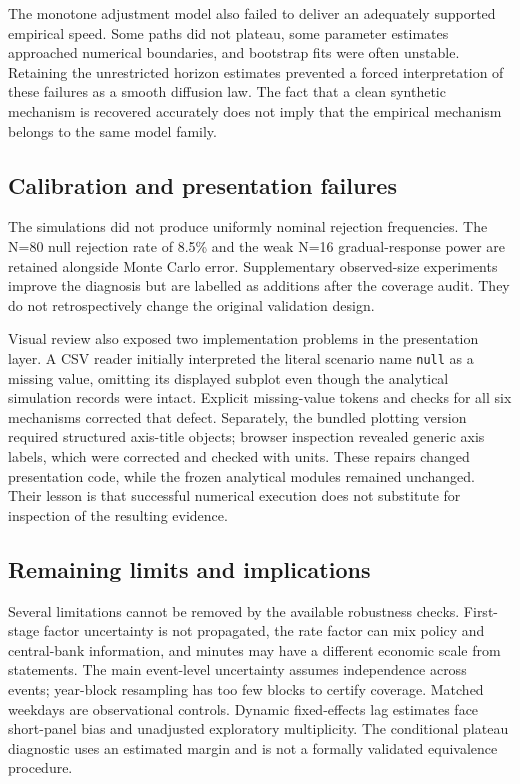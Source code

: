 The monotone adjustment model also failed to deliver an adequately supported empirical speed. Some paths did not plateau, some parameter estimates approached numerical boundaries, and bootstrap fits were often unstable. Retaining the unrestricted horizon estimates prevented a forced interpretation of these failures as a smooth diffusion law. The fact that a clean synthetic mechanism is recovered accurately does not imply that the empirical mechanism belongs to the same model family.

\subsection{Calibration and presentation failures}
The simulations did not produce uniformly nominal rejection frequencies. The N=80 null rejection rate of 8.5\% and the weak N=16 gradual-response power are retained alongside Monte Carlo error. Supplementary observed-size experiments improve the diagnosis but are labelled as additions after the coverage audit. They do not retrospectively change the original validation design.

Visual review also exposed two implementation problems in the presentation layer. A CSV reader initially interpreted the literal scenario name \texttt{null} as a missing value, omitting its displayed subplot even though the analytical simulation records were intact. Explicit missing-value tokens and checks for all six mechanisms corrected that defect. Separately, the bundled plotting version required structured axis-title objects; browser inspection revealed generic axis labels, which were corrected and checked with units. These repairs changed presentation code, while the frozen analytical modules remained unchanged. Their lesson is that successful numerical execution does not substitute for inspection of the resulting evidence.

\subsection{Remaining limits and implications}
Several limitations cannot be removed by the available robustness checks. First-stage factor uncertainty is not propagated, the rate factor can mix policy and central-bank information, and minutes may have a different economic scale from statements. The main event-level uncertainty assumes independence across events; year-block resampling has too few blocks to certify coverage. Matched weekdays are observational controls. Dynamic fixed-effects lag estimates face short-panel bias and unadjusted exploratory multiplicity. The conditional plateau diagnostic uses an estimated margin and is not a formally validated equivalence procedure.

